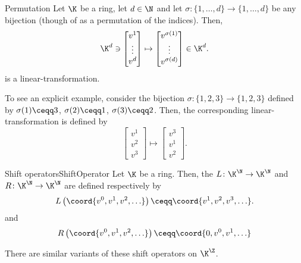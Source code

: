 \begin{exm}{Permutation}{}
	Let $\K$ be a ring, let $d\in \N$ and let $\sigma \colon \{ 1,\ldots ,d\} \rightarrow \{ 1,\ldots ,d\}$ be any bijection (though of as a permutation of the indices).  Then,
	\begin{equation}
		\K ^d\ni \begin{bmatrix}v^1 \\ \vdots \\ v^d\end{bmatrix}\mapsto \begin{bmatrix}v^{\sigma (1)} \\ \vdots \\ v^{\sigma (d)}\end{bmatrix}\in \K ^d.
	\end{equation}
	is a linear-transformation.
	
	To see an explicit example, consider the bijection $\sigma \colon \{ 1,2,3\} \rightarrow \{ 1,2,3\}$ defined by $\sigma (1)\ceqq 3$, $\sigma (2)\ceqq 1$, $\sigma (3)\ceqq 2$.  Then, the corresponding linear-transformation is defined by
	\begin{equation}
		\begin{bmatrix}v^1 \\ v^2 \\ v^3\end{bmatrix}\mapsto \begin{bmatrix}v^3 \\ v^1 \\ v^2\end{bmatrix}.
	\end{equation}
\end{exm}
\begin{exm}{Shift operators}{ShiftOperator}
	Let $\K$ be a ring.  Then, the  $L\colon \K ^{\N}\rightarrow \K ^{\N}$ and  $R\colon \K ^{\N}\rightarrow \K ^{\N}$ are defined respectively by
	\begin{equation}
	L\left( \coord{v^0,v^1,v^2,\ldots }\right) \ceqq \coord{v^1,v^2,v^3,\ldots }.
	\end{equation}
	and
	\begin{equation}
		R\left( \coord{v^0,v^1,v^2,\ldots }\right) \ceqq \coord{0,v^0,v^1,\ldots} 
	\end{equation}
	\begin{rmk}
		There are similar variants of these shift operators on $\K ^{\Z}$.
	\end{rmk}
\end{exm}
